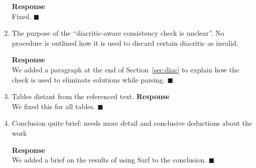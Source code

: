 \begin{enumerate}[leftmargin=0mm,label=\bfseries CommentR2.\arabic*]
\textbf{Response}\\
Fixed. 
$\blacksquare$

\item \label{Review.2.15}
The purpose of the ``diacritic-aware consistency check is unclear''. No
procedure is outlined how it is used to discard certain diacritic as invalid.

\textbf{Response}\\
We added a paragraph at the end of Section~\ref{sec:diac} to explain how the check is used
to eliminate solutions while parsing. 
$\blacksquare$


\item \label{Review.2.16}
Tables distant from the referenced text.
\textbf{Response}\\
We fixed this for all tables.
$\blacksquare$

\item \label{Review.2.17}
Conclusion quite brief: needs more detail and conclusive deductions about the
work

\textbf{Response}\\
We added a brief on the results of using Sarf to the conclusion. 
$\blacksquare$

\end{enumerate}
